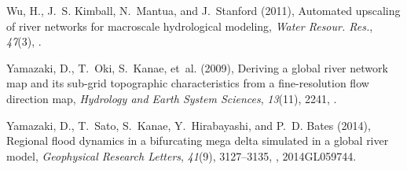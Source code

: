 \documentclass[jgrga, draft]{agutex}
\begin{document}
\begin{article}
\begin{thebibliography}{79}
Wu, H., J.~S. Kimball, N.~Mantua, and J.~Stanford (2011), {Automated upscaling
  of river networks for macroscale hydrological modeling}, \textit{Water
  Resour. Res.}, \textit{47}(3), .

Yamazaki, D., T.~Oki, S.~Kanae, et~al. (2009), Deriving a global river network
  map and its sub-grid topographic characteristics from a fine-resolution flow
  direction map, \textit{Hydrology and Earth System Sciences}, \textit{13}(11),
  2241, .

Yamazaki, D., T.~Sato, S.~Kanae, Y.~Hirabayashi, and P.~D. Bates (2014),
  Regional flood dynamics in a bifurcating mega delta simulated in a global
  river model, \textit{Geophysical Research Letters}, \textit{41}(9),
  3127--3135, , 2014GL059744.

\end{thebibliography}


%
%
\end{article}


%
%
%
%
\end{document}
